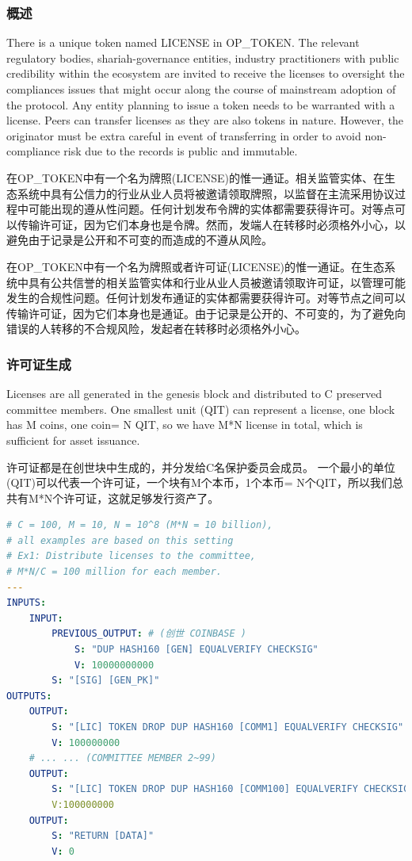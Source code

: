 \documentclass[a4paper,11pt]{article}
\begin{document}
\subsubsection{概述}

There is a unique token named LICENSE in OP\_TOKEN. The relevant regulatory bodies, shariah-governance entities, industry practitioners with public credibility within the ecosystem are invited to receive the licenses to oversight the compliances issues that might occur along the course of mainstream adoption of the protocol. Any entity planning to issue a token needs to be warranted with a license. Peers can transfer licenses as they are also tokens in nature. However, the originator must be extra careful in event of transferring in order to avoid non-compliance risk due to the records is public and immutable.  

在OP\_TOKEN中有一个名为牌照(LICENSE)的惟一通证。相关监管实体、在生态系统中具有公信力的行业从业人员将被邀请领取牌照，以监督在主流采用协议过程中可能出现的遵从性问题。任何计划发布令牌的实体都需要获得许可。对等点可以传输许可证，因为它们本身也是令牌。然而，发端人在转移时必须格外小心，以避免由于记录是公开和不可变的而造成的不遵从风险。

在OP\_TOKEN中有一个名为牌照或者许可证(LICENSE)的惟一通证。在生态系统中具有公共信誉的相关监管实体和行业从业人员被邀请领取许可证，以管理可能发生的合规性问题。任何计划发布通证的实体都需要获得许可。对等节点之间可以传输许可证，因为它们本身也是通证。由于记录是公开的、不可变的，为了避免向错误的人转移的不合规风险，发起者在转移时必须格外小心。
 

\subsubsection{许可证生成}

Licenses are all generated in the genesis block and distributed to C preserved committee members. One smallest unit (QIT) can represent a license, one block has M coins, one coin= N QIT, so we have M*N license in total, which is sufficient for asset issuance.

许可证都是在创世块中生成的，并分发给C名保护委员会成员。
一个最小的单位(QIT)可以代表一个许可证，一个块有M个本币，1个本币= N个QIT，所以我们总共有M*N个许可证，这就足够发行资产了。


\begin{lstlisting}[language=yaml, numbers=none,basicstyle=\footnotesize]
# C = 100, M = 10, N = 10^8 (M*N = 10 billion),
# all examples are based on this setting
# Ex1: Distribute licenses to the committee,
# M*N/C = 100 million for each member.
---
INPUTS:
	INPUT:
		PREVIOUS_OUTPUT: # (创世 COINBASE )
			S: "DUP HASH160 [GEN] EQUALVERIFY CHECKSIG"
			V: 10000000000
		S: "[SIG] [GEN_PK]"
OUTPUTS:
	OUTPUT:
		S: "[LIC] TOKEN DROP DUP HASH160 [COMM1] EQUALVERIFY CHECKSIG"
		V: 100000000
	# ... ... (COMMITTEE MEMBER 2~99)
	OUTPUT:
		S: "[LIC] TOKEN DROP DUP HASH160 [COMM100] EQUALVERIFY CHECKSIG"
		V:100000000
	OUTPUT:
		S: "RETURN [DATA]"
		V: 0
\end{lstlisting}
\end{document}
